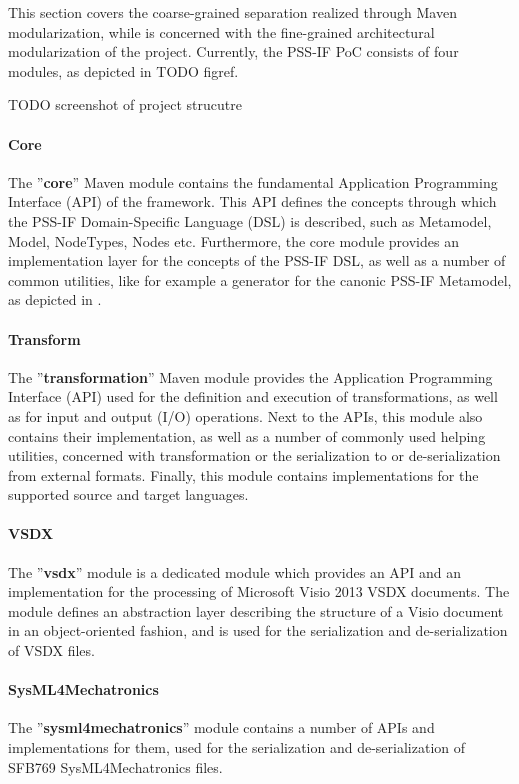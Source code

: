 This section covers the coarse-grained separation realized through Maven modularization, while  is concerned with the fine-grained architectural modularization of the project. Currently, the PSS-IF PoC consists of four modules, as depicted in \color{red} TODO figref\color{black}.

\color{red} TODO screenshot of project strucutre\color{black}

\paragraph{Core} The ''\textbf{core}'' Maven module contains the fundamental Application Programming Interface (API) of the framework. This API defines the concepts through which the PSS-IF Domain-Specific Language (DSL) is described, such as Metamodel, Model, NodeTypes, Nodes etc. Furthermore, the core module provides an implementation layer for the concepts of the PSS-IF DSL, as well as a number of common utilities, like for example a generator for the canonic PSS-IF Metamodel, as depicted in .

\paragraph{Transform} The ''\textbf{transformation}'' Maven module provides the Application Programming Interface (API) used for the definition and execution of transformations, as well as for input and output (I/O) operations. Next to the APIs, this module also contains their implementation, as well as a number of commonly used helping utilities, concerned with transformation or the serialization to or de-serialization from external formats. Finally, this module contains implementations for the supported source and target languages.

\paragraph{VSDX} The ''\textbf{vsdx}'' module is a dedicated module which provides an API and an implementation for the processing of Microsoft Visio 2013 VSDX documents. The module defines an abstraction layer describing the structure of a Visio document in an object-oriented fashion, and is used for the serialization and de-serialization of VSDX files.

\paragraph{SysML4Mechatronics} The ''\textbf{sysml4mechatronics}'' module contains a number of APIs and implementations for them, used for the serialization and de-serialization of SFB769 SysML4Mechatronics files.

